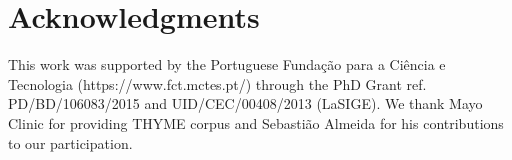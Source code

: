 \documentclass[11pt,a4paper]{article}
\begin{document}


\section*{Acknowledgments}

This work was supported by the Portuguese Fundação para a Ciência e Tecnologia (https://www.fct.mctes.pt/) through the PhD Grant ref. PD/BD/106083/2015 and UID/CEC/00408/2013 (LaSIGE).
We thank Mayo Clinic for providing THYME corpus and Sebastião Almeida for his contributions to our participation.

%
%



\end{document}
